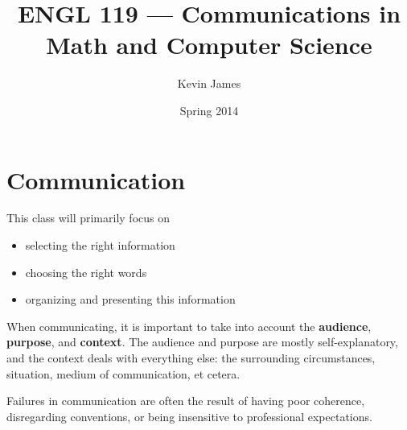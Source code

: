 \documentclass[12pt]{article}
\begin{document}
\title{ENGL 119 --- Communications in Math and Computer Science}
\author{Kevin James}
\date{\vspace{-2ex}Spring 2014}
\maketitle\HRule

\section{Communication}
This class will primarily focus on
\begin{itemize}
\item selecting the right information
\item choosing the right words
\item organizing and presenting this information
\end{itemize}

When communicating, it is important to take into account the {\bf audience}, {\bf purpose}, and {\bf context}. The audience and purpose are mostly self-explanatory, and the context deals with everything else: the surrounding circumstances, situation, medium of communication, et cetera.

Failures in communication are often the result of having poor coherence, disregarding conventions, or being insensitive to professional expectations.
\end{document}
